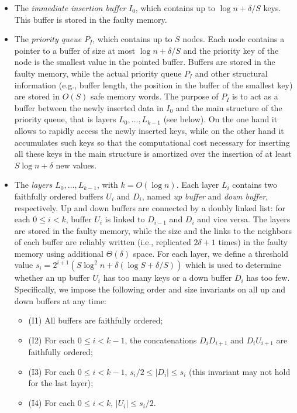 \documentclass[review,number]{elsarticle}
\newcommand{\BO}[1]{{O}\left(#1\right)}
\newcommand{\BT}[1]{{\Theta}\left(#1\right)}
\begin{document}
\begin{itemize}
 \item The \emph{immediate insertion buffer} $I_{0}$,
which contains up to $\log n + \delta / S$ keys. This buffer is stored in the
faulty memory.
 
 \item The \emph{priority queue $P_{I}$}, which contains up to $S$ nodes. Each
node contains a pointer to a buffer of size at most $\log n + \delta/S$ and
the priority key of
the node is the smallest value in the pointed buffer. Buffers are
stored in the faulty memory, while the actual priority queue $P_I$ and other
structural information (e.g., buffer length, the position in the buffer of the
smallest key) are stored in $\BO{S}$ safe
memory
 words. The purpose of $P_{I}$ is to act as a buffer between the newly inserted
data in $I_0$ and the main structure of the priority queue, that is layers
$L_{0},\ldots,L_{k-1}$ (see below). On the one hand it allows to rapidly  access
the newly inserted keys, while on the other hand it accumulates such keys so
that the computational cost necessary for inserting all these keys in the main
structure is amortized over the insertion of at least $S\log n + \delta$ new
values.  
 
 \item The \emph{layers $L_{0},\ldots,L_{k-1}$}, with  $k = \BO{\log n}$. Each
layer $L_i$ contains two faithfully ordered buffers $U_{i}$  and $D_{i}$,
 named \emph{up buffer} and \emph{down buffer}, respectively. Up and
down buffers
are connected by a doubly linked list: for each $0\leq i <k$, buffer $U_i$ is
linked to $D_{i-1}$ and $D_i$ and vice versa. The layers are stored in the
faulty memory, while the size and the links to the neighbors of each buffer are
reliably written (i.e., replicated $2\delta+1$ times) in the faulty memory
using additional $\BT{\delta}$ space. For each layer, we define a threshold
value $s_{i}=2^{i+1}\left(S \log^{2} n + \delta \left( \log S + \delta/ S
\right)
\right)$ which is used to determine whether an up buffer $U_{i}$ has too many
keys or a down buffer $D_{i}$ has too few. Specifically, we impose the
following order and size invariants on all up and down buffers at any time:
\begin{itemize}
 \item (I1)  All buffers are faithfully ordered; 
 \item (I2)  For each $0 \leq i < k-1$, the concatenations $D_{i}D_{i+1}$ and
$D_{i}U_{i+1}$ are faithfully ordered;
 \item (I3) For each $0 \leq i < k-1$, $s_{i}/2 \leq \vert D_{i} \vert \leq
s_{i}$ (this invariant may not hold for the last layer); 
\item (I4) For each $0 \leq i < k$, $\vert U_{i} \vert \leq s_{i}/2$.
\end{itemize}


\end{itemize}
\end{document}
